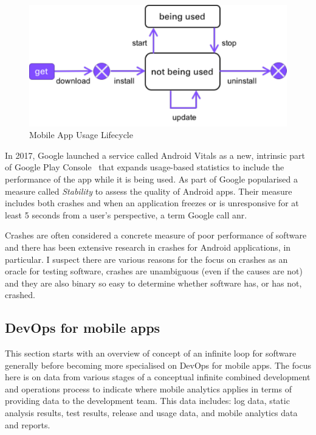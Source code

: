 
\begin{figure}
    \includegraphics[width=\linewidth]{images/mobile_app_usage_lifecycle.pdf}
    \caption{Mobile App Usage Lifecycle}
    \label{fig:mobile_app_usage_lifecycle}
\end{figure}

In 2017, Google launched a service called Android Vitals as a new, intrinsic part of Google Play Console~ that expands usage-based statistics to include the performance of the app while it is being used. As part of  Google popularised a measure called \emph{Stability} to assess the quality of Android apps. Their measure includes both crashes and when an application freezes or is unresponsive for at least 5 seconds from a user's perspective, a term Google call \Gls{anr}.

Crashes are often considered a concrete measure of poor performance of software and there has been extensive research in crashes for Android applications, in particular. I suspect there are various reasons for the focus on crashes as an oracle for testing software, crashes are unambiguous (even if the causes are not) and they are also binary so easy to determine whether software has, or has not, crashed. 

\subsection{DevOps for mobile apps}
This section starts with an overview of  concept of an infinite loop for software generally before becoming more specialised on DevOps for mobile apps. %
The focus here is on data from various stages of a conceptual infinite combined development and operations process to indicate where mobile analytics applies in terms of providing data to the development team. This data includes: log data, static analysis results, test results, release and usage data, and mobile analytics data and reports.

